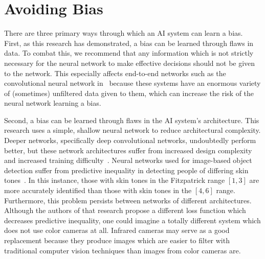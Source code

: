 \documentclass[paper=a4paper]{report}
\begin{document}
\FloatBarrier
\section{Avoiding Bias}

There are three primary ways through which an AI system can learn a bias. First, as this research
has demonstrated, a bias can be learned through flaws in data. To combat this, we recommend that any
information which is not strictly necessary for the neural network to make effective decisions
should not be given to the network. This especially affects end-to-end networks such as the
convolutional neural network in~\cite{bojarski2016end} because these systems have an enormous
variety of (sometimes) unfiltered data given to them, which can increase the risk of the neural
network learning a bias.

Second, a bias can be learned through flaws in the AI system's architecture. This research uses a
simple, shallow neural network to reduce architectural complexity. Deeper networks, specifically
deep convolutional networks, undoubtedly perform better, but these network architectures suffer from
increased design complexity and increased training difficulty~\cite{mhaskar2016deep}. Neural
networks used for image-based object detection suffer from predictive inequality in detecting people
of differing skin tones~\cite{wilson2019predictive}. In this instance, those with skin tones in the
Fitzpatrick range $[1, 3]$ are more accurately identified than those with skin tones in the $[4, 6]$
range. Furthermore, this problem persists between networks of different architectures. Although the
authors of that research propose a different loss function which decreases predictive inequality,
one could imagine a totally different system which does not use color cameras at all. Infrared
cameras may serve as a good replacement because they produce images which are easier to filter with
traditional computer vision techniques than images from color cameras are.
\end{document}
